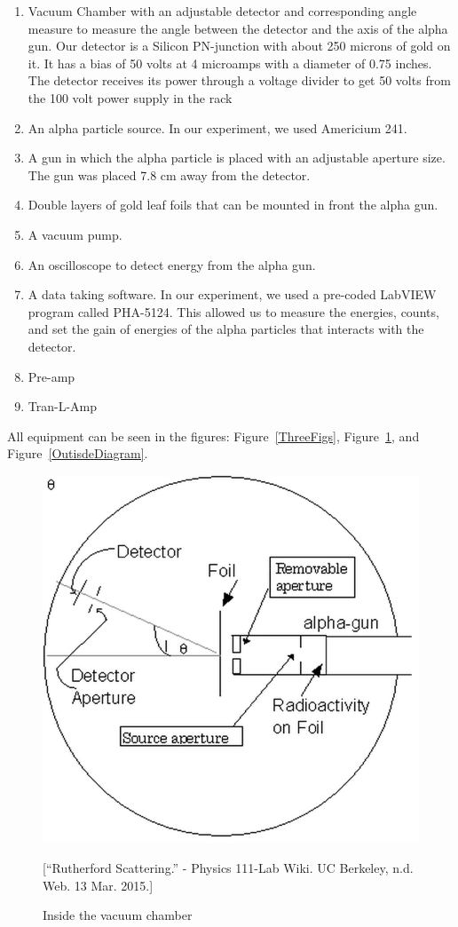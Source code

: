 \begin{enumerate}
\item Vacuum Chamber with an adjustable detector and corresponding angle measure to measure the angle between the detector and the axis of the alpha gun. Our detector is a Silicon PN-junction with about 250 microns of gold on it. It has a bias of 50 volts at 4 microamps with a diameter of 0.75 inches. The detector receives its power through a voltage divider to get 50 volts from the 100 volt power supply in the rack
\item An alpha particle source. In our experiment, we used Americium 241. 
\item A gun in which the alpha particle is placed with an adjustable aperture size. The gun was placed 7.8 cm away from the detector. 
\item Double layers of gold leaf foils that can be mounted in front the alpha gun.
\item A vacuum pump.
\item An oscilloscope to detect energy from the alpha gun. 
\item A data taking software. In our experiment, we used a pre-coded LabVIEW program called PHA-5124. This allowed us to measure the energies, counts, and set the gain of energies of the alpha particles that interacts with the detector. 
\item Pre-amp
\item Tran-L-Amp
\end{enumerate}

All equipment can be seen in the figures: Figure~\ref{ThreeFigs}, Figure~\ref{Diagram}, and Figure~\ref{OutisdeDiagram}.

\begin{figure}[h]
  \includegraphics[width = 5 cm]{Diagram.png}
  \begin{center}
  \caption{Inside the vacuum chamber}[\footnotesize{``Rutherford Scattering.'' - Physics 111-Lab Wiki. UC Berkeley, n.d. Web. 13 Mar. 2015.}]
  \label{Diagram}
  \end{center}
\end{figure}

